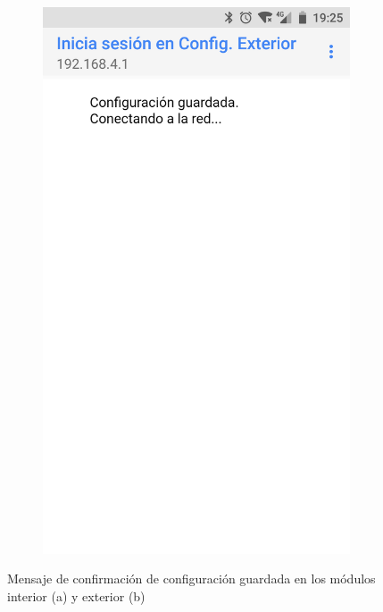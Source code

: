 \begin{figure}
\begin{subfigure}{0.49\columnwidth}
  \includegraphics[width=1\columnwidth,frame]{images/exterior-config-saved}
  \caption{}
  \label{fig:exterior-config-saved}
\end{subfigure}
\caption{Mensaje de confirmación de configuración guardada en los módulos interior (a) y exterior (b)}
\end{figure}



